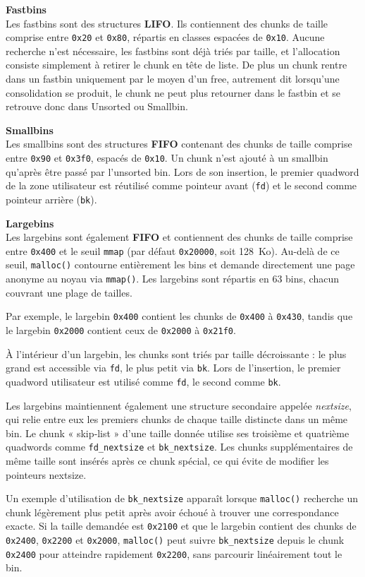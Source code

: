 \vp

\noindent\textbf{Fastbins}\\
Les fastbins sont des structures \textbf{LIFO}.
Ils contiennent des chunks de taille comprise entre \texttt{0x20} et \texttt{0x80},
répartis en classes espacées de \texttt{0x10}.
Aucune recherche n'est nécessaire, les fastbins sont déjà triés par taille, et
l'allocation consiste simplement à retirer le chunk en tête de liste.
De plus un chunk rentre dans un fastbin uniquement par le moyen d'un free, autrement
dit lorsqu'une consolidation se produit, le chunk ne peut plus retourner dans
le fastbin et se retrouve donc dans Unsorted ou Smallbin.

\vp

\noindent\textbf{Smallbins}\\
Les smallbins sont des structures \textbf{FIFO} contenant des chunks de taille comprise
entre \texttt{0x90} et \texttt{0x3f0}, espacés de \texttt{0x10}.
Un chunk n'est ajouté à un smallbin qu'après être passé par l'unsorted bin.
Lors de son insertion, le premier quadword de la zone utilisateur est réutilisé comme
pointeur avant (\texttt{fd}) et le second comme pointeur arrière (\texttt{bk}).

\vp

\noindent\textbf{Largebins}\\
Les largebins sont également \textbf{FIFO} et contiennent des chunks de taille comprise
entre \texttt{0x400} et le seuil \texttt{mmap} (par défaut \texttt{0x20000}, soit 128~Ko).
Au-delà de ce seuil, \texttt{malloc()} contourne entièrement les bins et demande
directement une page anonyme au noyau via \texttt{mmap()}.
Les largebins sont répartis en 63 bins, chacun couvrant une plage de tailles.

Par exemple, le largebin \texttt{0x400} contient les chunks de \texttt{0x400} à
\texttt{0x430}, tandis que le largebin \texttt{0x2000} contient ceux de
\texttt{0x2000} à \texttt{0x21f0}.

À l'intérieur d'un largebin, les chunks sont triés par taille décroissante :
le plus grand est accessible via \texttt{fd}, le plus petit via \texttt{bk}.
Lors de l'insertion, le premier quadword utilisateur est utilisé comme \texttt{fd},
le second comme \texttt{bk}.

Les largebins maintiennent également une structure secondaire appelée \textit{nextsize},
qui relie entre eux les premiers chunks de chaque taille distincte dans un même bin.
Le chunk « skip‑list » d'une taille donnée utilise ses troisième et quatrième quadwords
comme \texttt{fd\_nextsize} et \texttt{bk\_nextsize}.
Les chunks supplémentaires de même taille sont insérés après ce chunk spécial, ce qui
évite de modifier les pointeurs nextsize.

Un exemple d'utilisation de \texttt{bk\_nextsize} apparaît lorsque \texttt{malloc()}
recherche un chunk légèrement plus petit après avoir échoué à trouver une correspondance
exacte.
Si la taille demandée est \texttt{0x2100} et que le largebin contient des chunks de
\texttt{0x2400}, \texttt{0x2200} et \texttt{0x2000}, \texttt{malloc()} peut suivre
\texttt{bk\_nextsize} depuis le chunk \texttt{0x2400} pour atteindre rapidement
\texttt{0x2200}, sans parcourir linéairement tout le bin.
